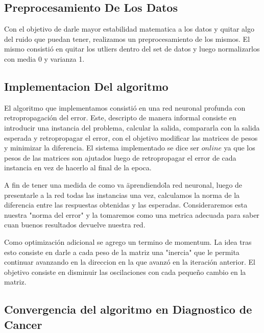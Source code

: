 \subsection{Preprocesamiento De Los Datos} 
Con el objetivo de darle mayor estabilidad matematica a los datos y quitar algo del ruido que puedan tener, realizamos un preprocesamiento de los mismos. El mismo consistió en quitar los utliers dentro del set de datos y luego normalizarlos con media 0 y varianza 1.

\subsection{Implementacion Del algoritmo} 

El algoritmo que implementamos consistió en una red neuronal profunda con retropropagación del error. Este, descripto de manera informal consiste en introducir una instancia del problema, calcular la salida, compararla con la salida esperada y retropropagar el error, con el objetivo modificar las matrices de pesos y minimizar la diferencia. El sistema implementado se dice ser $online$ ya que los pesos de las matrices son ajutados luego de retropropagar el error de cada instancia en vez de hacerlo al final de la epoca.

A fin de tener una medida de como va \"aprendiendo\" la red neuronal, luego de presentarle a la red todas las instancias una vez, calculamos la norma de la diferencia entre las respuestas obtenidas y las esperadas. Consideraremos esta nuestra "norma del error" y la tomaremos como una metrica adecuada para saber cuan buenos resultados devuelve nuestra red.


Como optimización adicional se agrego un termino de momentum. La idea tras esto consiste en darle a cada peso de la matriz una "inercia" que le permita continuar avanzando en la direccion en la que avanzó en la iteración anterior. El objetivo consiste en disminuir las oscilaciones con cada pequeño cambio en la matriz.

\subsection{Convergencia del algoritmo en Diagnostico de Cancer} 

